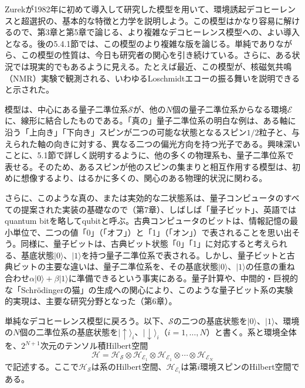 

Zurekが1982年に初めて導入して研究した模型\cite{ref009}を用いて、環境誘起デコヒーレンスと超選択の、基本的な特徴と力学を説明しよう。この模型はかなり容易に解けるので、第3章と第5章で論じる、より複雑なデコヒーレンス模型への、よい導入となる。後の5.4.1節では、この模型のより複雑な版を論じる。単純でありながら、この模型の性質は、今日も研究者の関心を引き続けている\cite{ref118}。さらに、ある状況では現実的でもあるように見える。たとえば最近、この模型が、核磁気共鳴（NMR）実験で観測される、いわゆるLoschmidtエコーの振る舞いを説明できると示された\cite{ref118,ref119,ref120}。

模型は、中心にある量子二準位系$\mathcal S$が、他の$N$個の量子二準位系からなる環境$\mathcal E$に、線形に結合したものである。「真の」量子二準位系の明白な例は、ある軸に沿う「上向き」「下向き」スピンが二つの可能な状態となるスピン$1/2$粒子と、与えられた軸の向きに対する、異なる二つの偏光方向を持つ光子である。興味深いことに、5.1節で詳しく説明するように、他の多くの物理系も、量子二準位系で表せる。そのため、あるスピンが他のスピンの集まりと相互作用する模型は、初めに想像するより、はるかに多くの、関心のある物理的状況に関わる。

さらに、このような真の、または実効的な二状態系は、量子コンピュータのすべての提案された実装の基礎なので（第7章）、しばしば「量子ビット」、英語ではquantum bitを略してqubitと呼ぶ。古典コンピュータのビットは、情報記憶の最小単位で、二つの値「0」（「オフ」）と「1」（「オン」）で表されることを思い出そう。同様に、量子ビットは、古典ビット状態「0」「1」に対応すると考えられる、基底状態$\lvert0\rangle$、$\lvert1\rangle$を持つ量子二準位系で表される。しかし、量子ビットと古典ビットの主要な違いは、量子二準位系を、その基底状態$\lvert0\rangle$、$\lvert1\rangle$の任意の重ね合わせ$\alpha\lvert0\rangle+\beta\lvert1\rangle$に準備できるという事実にある。量子計算や、中間的・巨視的な「Schrödingerの猫」の生成への関心により、このような量子ビット系の実験的実現は、主要な研究分野となった（第6章）。

\hypertarget{srcpage:89}{}\label{srcpage:89}
単純なデコヒーレンス模型に戻ろう。以下、$\mathcal S$の二つの基底状態を$\lvert0\rangle$、$\lvert1\rangle$、環境の$N$個の二準位系の基底状態を$\lvert\uparrow\rangle_i$、$\lvert\downarrow\rangle_i$（$i=1,\ldots,N$）と書く。系と環境全体を、$2^{N+1}$次元のテンソル積Hilbert空間
\begin{equation}\mathcal H=\mathcal H_{\mathcal S}\otimes\mathcal H_{\mathcal E_1}\otimes\mathcal H_{\mathcal E_1}\otimes\cdots\otimes\mathcal H_{\mathcal E_N}\tag{2.98}\end{equation}
で記述する。ここで$\mathcal H_{\mathcal S}$は系のHilbert空間、$\mathcal H_{\mathcal E_i}$は第$i$環境スピンのHilbert空間である。

